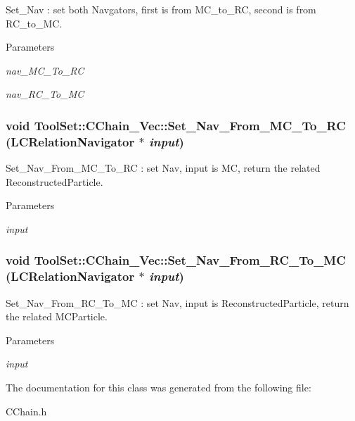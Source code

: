Set\_\-Nav : set both Navgators, first is from MC\_\-to\_\-RC, second is from RC\_\-to\_\-MC. 
\begin{DoxyParams}{Parameters}
\item[{\em nav\_\-MC\_\-To\_\-RC}]\item[{\em nav\_\-RC\_\-To\_\-MC}]\end{DoxyParams}
\hypertarget{classToolSet_1_1CChain__Vec_aa9b42030de1b1ceb6da2c01d139e74b6}{
\subsubsection[{Set\_\-Nav\_\-From\_\-MC\_\-To\_\-RC}]{\setlength{\rightskip}{0pt plus 5cm}void ToolSet::CChain\_\-Vec::Set\_\-Nav\_\-From\_\-MC\_\-To\_\-RC (LCRelationNavigator $\ast$ {\em input})}}
\label{classToolSet_1_1CChain__Vec_aa9b42030de1b1ceb6da2c01d139e74b6}


Set\_\-Nav\_\-From\_\-MC\_\-To\_\-RC : set Nav, input is MC, return the related ReconstructedParticle. 
\begin{DoxyParams}{Parameters}
\item[{\em input}]\end{DoxyParams}
\hypertarget{classToolSet_1_1CChain__Vec_afe1fa08d6a66df76ff6e2607f6832979}{
\subsubsection[{Set\_\-Nav\_\-From\_\-RC\_\-To\_\-MC}]{\setlength{\rightskip}{0pt plus 5cm}void ToolSet::CChain\_\-Vec::Set\_\-Nav\_\-From\_\-RC\_\-To\_\-MC (LCRelationNavigator $\ast$ {\em input})}}
\label{classToolSet_1_1CChain__Vec_afe1fa08d6a66df76ff6e2607f6832979}


Set\_\-Nav\_\-From\_\-RC\_\-To\_\-MC : set Nav, input is ReconstructedParticle, return the related MCParticle. 
\begin{DoxyParams}{Parameters}
\item[{\em input}]\end{DoxyParams}


The documentation for this class was generated from the following file:\begin{DoxyCompactItemize}
\item 
CChain.h\end{DoxyCompactItemize}
